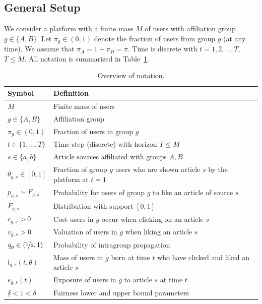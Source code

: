 \documentclass[letterpaper]{article} %
\begin{document}
\subsection{General Setup}
We consider a platform with a finite mass $M$ of users with  affiliation group $g\in\{A,B\}$.
Let $\pi_g\in(0,1)$ denote the fraction of users from group $g$ (at any time).
We assume that $\pi_A = 1-\pi_B = \pi$.
Time is discrete with $t=1,2, \ldots, T$, $T\leq M$.
All notation is summarized in Table~\ref{tab:overview_of_notation}.

\begin{table}[ht]
  \centering
  \begin{tabular}{ll}
    \toprule
    Symbol & Definition \\
    \midrule
    $M$ & Finite mass of users  \\
    $g\in\{A,B\}$ & Affiliation group \\
    $\pi_g\in (0,1)$ & Fraction of users in group $g$  \\
    $t\in\{1,\dots,T\}$ & Time step (discrete) with horizon $T\leq M$ \\
    $s\in \{a,b\}$ & Article sources affiliated with groups $A,B$ \\
    $\theta_{g,s} \in [0,1]$ & Fraction of group $g$ users who are shown article $s$ by the platform at $t=1$\\
    $p_{g,s} \sim F_{g,s}$ & Probability for users of group $g$ to like an article of source $s$ \\
    $F_{g,s}$ & Distribution with support $[0,1]$ \\
    $c_{g,s}>0$ & Cost users in $g$ occur when clicking on an article $s$ \\
    $v_{g,s}>0$ & Valuation of users in $g$ when liking an article $s$ \\
    $q_g \in (\nicefrac{1}{2},1)$ & Probability of intragroup propagation \\
    $l_{g,s}(t,\theta)$ & Mass of users in $g$ born at time $t$ who have clicked and liked an article $s$ \\
    $e_{g,s}(t)$ & Exposure of users in $g$ to article $s$ at time $t$ \\
    $\underline{\delta} <1 < \overline{\delta}$ & Fairness lower and upper bound parameters\\ %
    \bottomrule
  \end{tabular}
  \caption{Overview of notation.}
  \label{tab:overview_of_notation}
\end{table}
\end{document}
